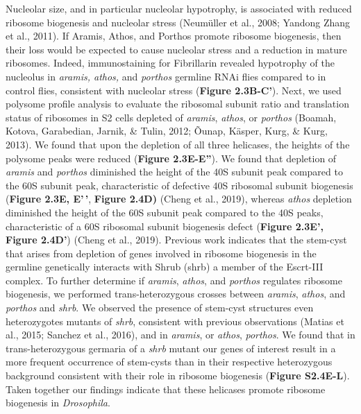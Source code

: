 \documentclass[12pt,oneside]{reedthesis}
\begin{document}
Nucleolar size, and in particular nucleolar hypotrophy, is associated with reduced ribosome biogenesis and nucleolar stress (Neumüller et al., 2008; Yandong Zhang et al., 2011). If Aramis, Athos, and Porthos promote ribosome biogenesis, then their loss would be expected to cause nucleolar stress and a reduction in mature ribosomes. Indeed, immunostaining for Fibrillarin revealed hypotrophy of the nucleolus in \emph{aramis, athos,} and \emph{porthos} germline RNAi flies compared to in control flies, consistent with nucleolar stress (\textbf{Figure 2.3B-C'}). Next, we used polysome profile analysis to evaluate the ribosomal subunit ratio and translation status of ribosomes in S2 cells depleted of \emph{aramis}, \emph{athos}, or \emph{porthos} (Boamah, Kotova, Garabedian, Jarnik, \& Tulin, 2012; Õunap, Käsper, Kurg, \& Kurg, 2013). We found that upon the depletion of all three helicases, the heights of the polysome peaks were reduced (\textbf{Figure 2.3E-E''}). We found that depletion of \emph{aramis} and \emph{porthos} diminished the height of the 40S subunit peak compared to the 60S subunit peak, characteristic of defective 40S ribosomal subunit biogenesis (\textbf{Figure 2.3E, E'\,'}, \textbf{Figure 2.4D)} (Cheng et al., 2019), whereas \emph{athos} depletion diminished the height of the 60S subunit peak compared to the 40S peaks, characteristic of a 60S ribosomal subunit biogenesis defect (\textbf{Figure 2.3E', Figure 2.4D'}) (Cheng et al., 2019). Previous work indicates that the stem-cyst that arises from depletion of genes involved in ribosome biogenesis in the germline genetically interacts with Shrub (shrb) a member of the Escrt-III complex. To further determine if \emph{aramis}, \emph{athos}, and \emph{porthos} regulates ribosome biogenesis, we performed trans-heterozygous crosses between \emph{aramis}, \emph{athos}, and \emph{porthos} and \emph{shrb}. We observed the presence of stem-cyst structures even heterozygotes mutants of \emph{shrb}, consistent with previous observations (Matias et al., 2015; Sanchez et al., 2016), and in \emph{aramis}, or \emph{athos}, \emph{porthos}. We found that in trans-heterozygous germaria of a \emph{shrb} mutant our genes of interest result in a more frequent occurrence of stem-cysts than in their respective heterozygous background consistent with their role in ribosome biogenesis (\textbf{Figure S2.4E-L}). Taken together our findings indicate that these helicases promote ribosome biogenesis in \emph{Drosophila}.
\end{document}
